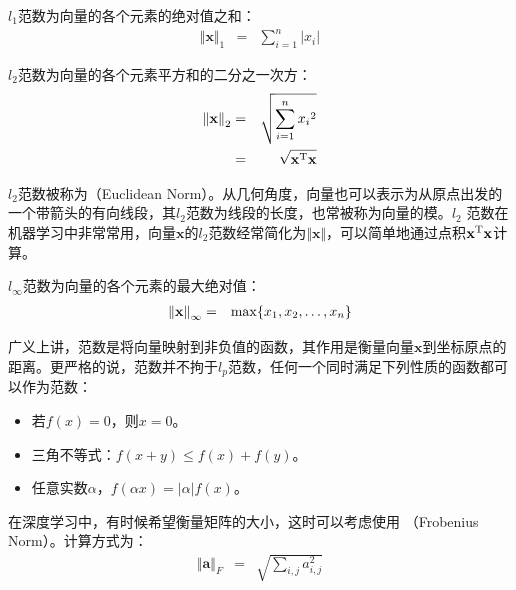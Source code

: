 \parinterval $ l_1 $范数为向量的各个元素的绝对值之和：
\begin{eqnarray}
{\Vert{\mathbf x}\Vert}_1&=&\sum_{i=1}^{n}{\vert x_{i}\vert}
\label{eq:5-15}
\end{eqnarray}

\parinterval $ l_2 $范数为向量的各个元素平方和的二分之一次方：
\begin{eqnarray}
{\Vert{\mathbf x}\Vert}_2&=&\sqrt{\sum_{i=1}^{n}{{x_{i}}^2}} \nonumber \\
                                      &=&\sqrt{{\mathbf x}^{\rm T}\mathbf x}
\label{eq:5-16}
\end{eqnarray}

\parinterval $ l_2 $范数被称为{\small{}}（Euclidean Norm）。从几何角度，向量也可以表示为从原点出发的一个带箭头的有向线段，其$ l_2 $范数为线段的长度，也常被称为向量的模。$ l_2 $ 范数在机器学习中非常常用，向量$ \mathbf x $的$ l_2 $范数经常简化为$ \Vert{\mathbf x}\Vert $，可以简单地通过点积$ {\mathbf x}^{\rm T}\mathbf x $计算。

\parinterval $ l_{\infty} $范数为向量的各个元素的最大绝对值：
\begin{eqnarray}
{\Vert{\mathbf x}\Vert}_{\infty}&=&{\rm{max}}\{x_1,x_2,\dots,x_n\}
\label{eq:5-17}
\end{eqnarray}

\parinterval 广义上讲，范数是将向量映射到非负值的函数，其作用是衡量向量$ \mathbf x $到坐标原点的距离。更严格的说，范数并不拘于$ l_p $范数，任何一个同时满足下列性质的函数都可以作为范数：

\begin{itemize}
\vspace{0.5em}
\item 若$ f(x)=0 $，则$ x=0 $。
\vspace{0.5em}
\item 三角不等式：$ f(x+y)\leqslant f(x)+f(y) $。
\vspace{0.5em}
\item 任意实数$ \alpha $，$ f(\alpha x)=\vert \alpha \vert f(x) $。
\vspace{0.5em}
\end{itemize}

\parinterval 在深度学习中，有时候希望衡量矩阵的大小，这时可以考虑使用 {\small{}}（Frobenius Norm）。计算方式为：
\begin{eqnarray}
{\Vert{\mathbf a}\Vert}_F&=&\sqrt{\sum_{i,j} a_{i,j}^2}
\label{eq:5-18}
\end{eqnarray}

